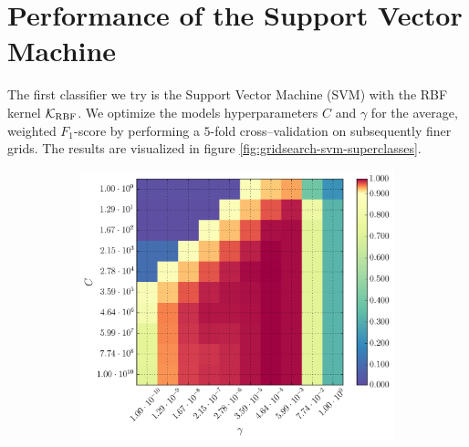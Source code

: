 
\section{Performance of the Support Vector Machine}

The first classifier we try is the Support Vector Machine (SVM) with the RBF kernel $\mathcal{K}_{\text{RBF}}$. We optimize the models hyperparameters $C$ and $\gamma$ for the average, weighted $F_1$-score by performing a $5$-fold cross--validation on subsequently finer grids. The results are visualized in figure \ref{fig:gridsearch-svm-superclasses}.

\begin{figure}[h]
	\centering
	\begin{subfigure}[t]{0.49\textwidth}
		\centering
		\includegraphics[width=\textwidth]{figures/gridsearch/svm/superclasses/svm-superclasses-01.png}				
	\end{subfigure}
	\begin{subfigure}[t]{0.49\textwidth}
		\centering

\end{subfigure}
\end{figure}
